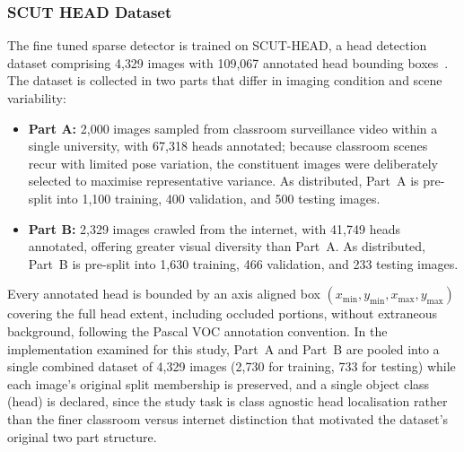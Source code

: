 \subsubsection{SCUT HEAD Dataset}
The fine tuned sparse detector is trained on SCUT-HEAD, a head detection dataset comprising 4{,}329 images with 109{,}067 annotated head bounding boxes~\cite{peng2018scuthead}. The dataset is collected in two parts that differ in imaging condition and scene variability:

\begin{itemize}
	\item \textbf{Part A:} 2{,}000 images sampled from classroom surveillance video within a single university, with 67{,}318 heads annotated; because classroom scenes recur with limited pose variation, the constituent images were deliberately selected to maximise representative variance. As distributed, Part~A is pre-split into 1{,}100 training, 400 validation, and 500 testing images.
	\item \textbf{Part B:} 2{,}329 images crawled from the internet, with 41{,}749 heads annotated, offering greater visual diversity than Part~A. As distributed, Part~B is pre-split into 1{,}630 training, 466 validation, and 233 testing images.
\end{itemize}

Every annotated head is bounded by an axis aligned box $(x_{\min}, y_{\min}, x_{\max}, y_{\max})$ covering the full head extent, including occluded portions, without extraneous background, following the Pascal VOC annotation convention. In the implementation examined for this study, Part~A and Part~B are pooled into a single combined dataset of 4{,}329 images (2{,}730 for training, 733 for testing) while each image's original split membership is preserved, and a single object class (head) is declared, since the study task is class agnostic head localisation rather than the finer classroom versus internet distinction that motivated the dataset's original two part structure.

